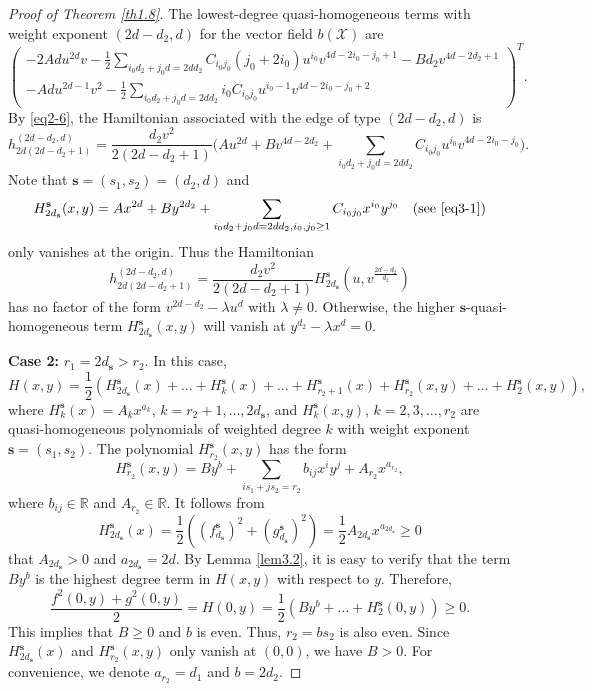 \documentclass[10pt,a4paper]{amsart}
\numberwithin{equation}{section}
\begin{document}
\begin{proof}[Proof of Theorem \ref{th1.8}]
The lowest-degree quasi-homogeneous terms with weight exponent $(2d-d_2, d)$ for the 
vector field $b(\mathcal{X})$ are
\[
\begin{pmatrix}
 -2Adu^{2d}v-\frac{1}{2}\sum_{i_0d_2+j_0d=2d d_{2}}C_{i_0j_0}(j_0+2i_0)u^{i_0}
 v^{4d-2i_0-j_0+1}-Bd_2v^{4d-2d_2+1}  \\
 -Adu^{2d-1}v^{2}-\frac{1}{2}\sum_{i_0d_2+j_0d=2d d_{2}}i_0C_{i_0j_0}u^{i_0-1}
 v^{4d-2i_0-j_0+2}
\end{pmatrix}^T.
\]
By \eqref{eq2-6}, the Hamiltonian associated with the edge of type $(2d-d_2, d)$ is
\[
h_{2d(2d-d_2+1)}^{(2d-d_2,d)}
=\frac{d_2v^{2}}{2(2d-d_2+1)}
\Big(Au^{2d}+Bv^{4d-2d_2}+\sum_{i_0d_2+j_0d=2d d_{2}}C_{i_0j_0}u^{i_0}v^{4d-2i_0-j_0}\Big).
\]
Note that $\mathbf{s}=(s_1,s_2)=(d_2, d)$ and
$$
H^{\mathbf{s}}_{2d_{\mathbf{s}}}(x,y)=Ax^{2d}
+By^{2d_2}+\sum_{i_0d_2+j_0d=2d d_{2}, i_0, j_0\geq1}C_{i_0j_0}x^{i_0}y^{j_0}\quad
 \text{(see \eqref{eq3-1})}
 $$
only vanishes at the origin. Thus the Hamiltonian
\[
h_{2d(2d-d_2+1)}^{(2d-d_2,d)}
=\frac{d_2v^{2}}{2(2d-d_2+1)}H^{\mathbf{s}}_{2d_{\mathbf{s}}}
\left(u,v^{\frac{2d-d_2}{d_2}}\right)
\]
has no factor of the form $v^{2d-d_2}-\lambda u^{d}$ with $\lambda\neq 0$. 
Otherwise, the higher $\mathbf{s}$-quasi-homogeneous term 
$H^{\mathbf{s}}_{2d_{\mathbf{s}}}(x,y)$ will vanish at $y^{d_2}-\lambda x^d=0$.
\smallskip

\noindent\textbf{Case 2:}
$r_1=2d_{\mathbf{s}}>r_2$.
In this case, 
\begin{equation}\label{eq3-7}
H(x,y)=\frac{1}{2}\left(H^{\mathbf{s}}_{2d_{\mathbf{s}}}(x)+\dots
+H^{\mathbf{s}}_{k}(x)+\dots+H^{\mathbf{s}}_{r_2+1}(x)+H^{\mathbf{s}}_{r_2}(x,y)
+\dots+H^{\mathbf{s}}_{2}(x,y)\right),
\end{equation}
where $H^{\mathbf{s}}_k(x)=A_kx^{a_k}$, $k=r_2+1, \ldots, 2d_{\mathbf{s}}$, and 
$H^{\mathbf{s}}_{k}(x,y)$, $k=2,3,\ldots, r_2$ are quasi-homogeneous polynomials of 
weighted degree $k$ with weight exponent $\mathbf{s}=(s_1,s_2)$. 
The polynomial $H^{\mathbf{s}}_{r_2}(x,y)$ has the  form
\[
H^{\mathbf{s}}_{r_2}(x,y)=By^{b}+\sum_{is_1+js_2
=r_2}b_{ij}x^{i}y^{j}+A_{r_2}x^{a_{r_2}},
\]
where $b_{ij}\in \mathbb{R}$ and $A_{r_2}\in \mathbb{R}$.  It follows from
\[
H^{\mathbf{s}}_{2d_{\mathbf{s}}}(x)=
\frac{1}{2}\left(\left(f^{\mathbf{s}}_{d_{\mathbf{s}}}\right)^2
+\left(g^{\mathbf{s}}_{d_{\mathbf{s}}}\right)^2\right)
=\frac{1}{2}A_{2d_{\mathbf{s}}}x^{a_{2d_{\mathbf{s}}}}\geq 0
\]
that $A_{2d_{\mathbf{s}}}>0$ and $a_{2d_{\mathbf{s}}}=2d$. 
By Lemma \ref{lem3.2}, it is easy to verify that the term  $By^b$ is the highest 
degree term in $H(x,y)$ with respect to $y$. Therefore,
\[
\frac{f^{2}(0,y)+g^{2}(0,y)}{2}=H(0,y)=\frac{1}{2}(By^b
+\dots+H^{\mathbf{s}}_{2}(0,y))\geq 0.
\]
This implies that $B\geq 0$ and $b$ is even. Thus, $r_2=bs_2$ is also even. 
Since $H^{\mathbf{s}}_{2d_{\mathbf{s}}}(x)$ and $H^{\mathbf{s}}_{r_2}(x,y)$ only 
vanish at $(0,0)$,  we have $B>0$.  For convenience, we denote $a_{r_2}=d_1$ and 
$b=2d_2$.


\end{proof}
\end{document}
